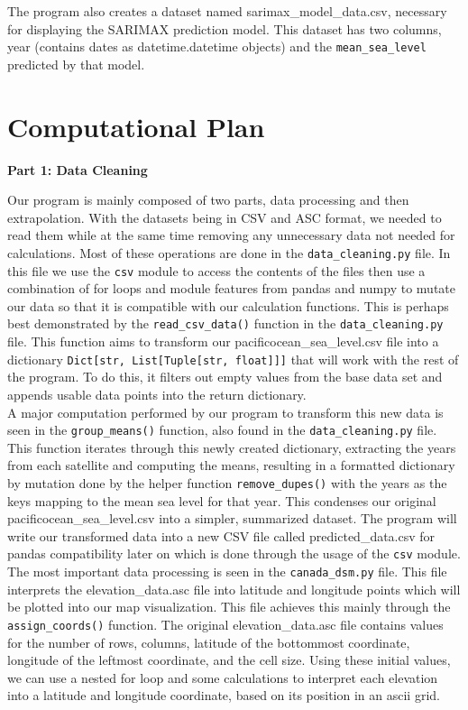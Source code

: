 \documentclass[fontsize=11pt]{article}
\begin{document}
    The program also creates a dataset named sarimax\_model\_data.csv, necessary for displaying the SARIMAX prediction model. This dataset has two columns, year (contains dates as datetime.datetime objects) and the \texttt{mean\_sea\_level} predicted by that model. \\

    \section*{Computational Plan}
    \textbf{Part 1: Data Cleaning}

    \hspace{\parindent}Our program is mainly composed of two parts, data processing and then extrapolation. With the datasets being in CSV and ASC format, we needed to read them while at the same time removing any unnecessary data not needed for calculations. Most of these operations are done in the \texttt{data\_cleaning.py} file. In this file we use the \texttt{csv} module to access the contents of the files then use a combination of for loops and module features from pandas and numpy to mutate our data so that it is compatible with our calculation functions. This is perhaps best demonstrated by the \texttt{read\_csv\_data()} function in the \texttt{data\_cleaning.py} file. This function aims to transform our pacificocean\_sea\_level.csv file into a dictionary \texttt{Dict[str, List[Tuple[str, float]]]} that will work with the rest of the program. To do this, it filters out empty values from the base data set and appends usable data points into the return dictionary. \\

    A major computation performed by our program to transform this new data is seen in the \texttt{group\_means()} function, also found in the \texttt{data\_cleaning.py} file. This function iterates through this newly created dictionary, extracting the years from each satellite and computing the means, resulting in a formatted dictionary by mutation done by the helper function  \texttt{remove\_dupes()} with the years as the keys mapping to the mean sea level for that year. This condenses our original pacificocean\_sea\_level.csv into a simpler, summarized dataset. The program will write our transformed data into a new CSV file called predicted\_data.csv for pandas compatibility later on which is done through the usage of the \texttt{csv} module. \\

    The most important data processing is seen in the \texttt{canada\_dsm.py} file. This file interprets the elevation\_data.asc file into latitude and longitude points which will be plotted into our map visualization. This file achieves this mainly through the \texttt{assign\_coords()} function. The original elevation\_data.asc file contains values for the number of rows, columns, latitude of the bottommost coordinate, longitude of the leftmost coordinate, and the cell size. Using these initial values, we can use a nested for loop and some calculations to interpret each elevation into a latitude and longitude coordinate, based on its position in an ascii grid. \\
\end{document}
